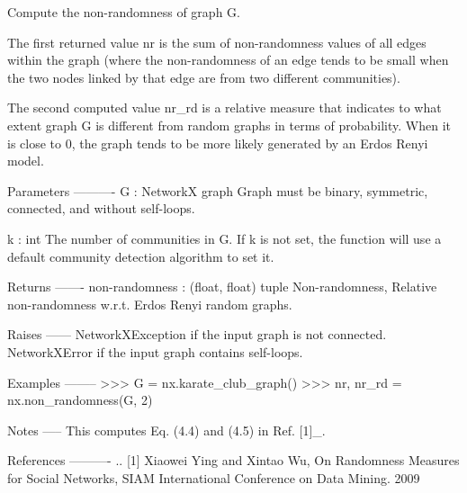 \begin{DoxyVerb}Compute the non-randomness of graph G.

The first returned value nr is the sum of non-randomness values of all
edges within the graph (where the non-randomness of an edge tends to be
small when the two nodes linked by that edge are from two different
communities).

The second computed value nr_rd is a relative measure that indicates
to what extent graph G is different from random graphs in terms
of probability. When it is close to 0, the graph tends to be more
likely generated by an Erdos Renyi model.

Parameters
----------
G : NetworkX graph
    Graph must be binary, symmetric, connected, and without self-loops.

k : int
    The number of communities in G.
    If k is not set, the function will use a default community
    detection algorithm to set it.

Returns
-------
non-randomness : (float, float) tuple
    Non-randomness, Relative non-randomness w.r.t.
    Erdos Renyi random graphs.

Raises
------
NetworkXException
    if the input graph is not connected.
NetworkXError
    if the input graph contains self-loops.

Examples
--------
>>> G = nx.karate_club_graph()
>>> nr, nr_rd = nx.non_randomness(G, 2)

Notes
-----
This computes Eq. (4.4) and (4.5) in Ref. [1]_.

References
----------
.. [1] Xiaowei Ying and Xintao Wu,
       On Randomness Measures for Social Networks,
       SIAM International Conference on Data Mining. 2009
\end{DoxyVerb}
 